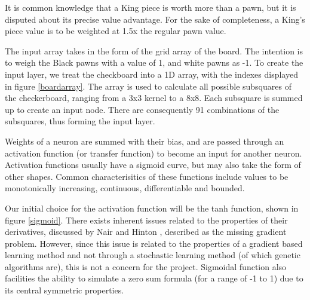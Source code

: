 \documentclass[12pt,a4paper]{article}
\begin{document}
    It is common knowledge that a King piece is worth more than a pawn, but it is disputed about its precise value advantage. For the sake of completeness, a King's piece value is to be weighted at 1.5x the regular pawn value. 

    The input array takes in the form of the grid array of the board. The intention is to weigh the Black pawns with a value of 1, and white pawns as -1. To create the input layer, we treat the checkboard into a 1D array, with the indexes displayed in figure \ref{boardarray}. The array is used to calculate all possible subsquares of the checkerboard, ranging from a 3x3 kernel to a 8x8. Each subsquare is summed up to create an input node. There are consequently 91 combinations of the subsquares, thus forming the input layer. 
    
    Weights of a neuron are summed with their bias, and are passed through an activation function (or transfer function) to become an input for another neuron. Activation functions usually have a sigmoid curve, but may also take the form of other shapes. Common characterisitics of these functions include values to be monotonically increasing, continuous, differentiable and bounded.

    Our initial choice for the activation function will be the tanh function, shown in figure \ref{sigmoid}. There exists inherent issues related to the properties of their derivatives, discussed by Nair and Hinton \cite{nair_rectified_2010}, described as the missing gradient problem. However, since this issue is related to the properties of a gradient based learning method and not through a stochastic learning method (of which genetic algorithms are), this is not a concern for the project. Sigmoidal function also facilities the ability to simulate a zero sum formula (for a range of -1 to 1) due to its central symmetric properties.
\end{document}
